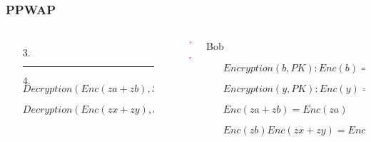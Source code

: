 \documentclass[xcolor=table]{beamer}
\newcommand{\red}[1]{\textcolor{red}{#1}}
\begin{document}
\begin{frame}
\frametitle{PPWAP}

\begin{columns}
\begin{column}{5cm}
\hspace{16mm}{Alice}
\begin{itemize} \itemsep1pt \parskip0pt 
  \item[] 
  \item[] $\;$\newline
  \item[$3.$] \hspace{4mm}{\scriptsize $Enc(za+zb)$}
  \item[] \hspace{4mm}{\scriptsize $Enc(zx+zy)$}
\end{itemize}

\begin{itemize} \itemsep1pt \parskip0pt 
  \item[] \noindent\rule{11cm}{0.4pt}
  \item[$4.$] {\scriptsize $Decryption(Enc(za+zb), SK): za+zb$}
  \item[] {\scriptsize $Decryption(Enc(zx+zy), SK): zx+zy$}
\end{itemize}
\end{column}
\begin{column}{1cm}
\begin{itemize} \itemsep1pt \parskip0pt 
  \item[] \vspace{16 mm}
  \item[] \red{\Huge $\Leftarrow $}
  \item[] \vspace{8 mm}
  \item[] \red{\Huge $\Rightarrow $}
\end{itemize}
\vspace{1 cm}
\end{column}
\begin{column}{6.2cm}
\vspace{4 mm}
\hspace{16mm}Bob
\begin{itemize} \itemsep0pt \parskip0pt 
  \item[] {\scriptsize $Encryption(b ,PK):Enc(b)\Rightarrow Enc(zb)$}
  \item[] {\scriptsize $Encryption(y ,PK):Enc(y)\Rightarrow~Enc(zy)$}
  \item[] {\scriptsize $Enc(za+zb) = Enc(za)$}
  \item[] {\scriptsize $Enc(zb) Enc(zx+zy) = Enc(zx) Enc(zy)$}
\end{itemize}
\vspace{6mm}
\begin{itemize} \itemsep1pt \parskip0pt 
  \item[] 
  \item[] 
  \item[] 
\end{itemize}
\end{column}
\end{columns}


\end{frame}
\end{document}

